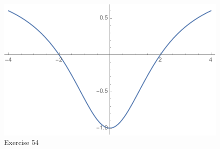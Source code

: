 \documentclass[letterpaper, landscape]{exam}
\begin{document}
\begin{description}
\begin{solution}
        \begin{figure}[H]
          \centering
          \includegraphics[scale = 0.6]{ex41_54.pdf}
        \caption{Exercise 54}
        \label{fig:ex41_54}
        \end{figure}
      \end{solution}

  \end{description}
\end{document}
